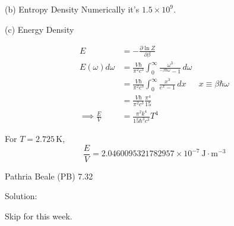 \begin{homeworkProblem}
\begin{callout}{(b) Entropy Density}
        Numerically it's $1.5\times10^9$.
    \end{callout}
    \newpage
    \begin{callout}{(c) Energy Density}

        \begin{align*}
            E &= -\frac{\partial \ln Z}{\partial \beta} \\ 
            E(\omega) d \omega &= \frac{V \hbar}{\pi^{2}c^{3}}\int_{0}^{\infty} \frac{\omega^{3}}{^{-\beta \hbar \omega}-1} \,d \omega \\
                               &= \frac{V \hbar}{\pi^{2}c^{3}} \int_{0}^{\infty} \frac{x^{3}}{e^{x}-1} \,dx &x\equiv \beta\hbar \omega \\
                               &= \frac{V \hbar}{\pi^{2}c^{3}} \frac{\pi^{4}}{15} \\ 
            \implies \frac{E}{V} &= \frac{\pi^{2}k^{4}}{15 \hbar^{3}c^{3}}T^{4}
        \end{align*}

        For $T=2.725\,\mathrm{K}$, 
        $$\frac{E}{V} = 2.0460095321782957\times10^{-7} \mathrm{~J \cdot m^{-3}}$$

    \end{callout}
\end{homeworkProblem}

\begin{homeworkProblem}
    Pathria Beale (PB) 7.32
    \begin{callout}{Solution:}

        Skip for this week.

    \end{callout}
\end{homeworkProblem}
